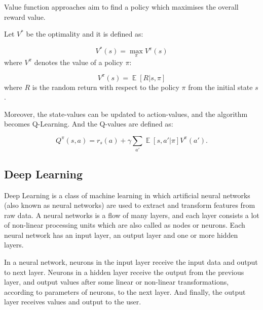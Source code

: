 \documentclass[a4paper]{article}
\DeclareMathOperator{\E}{\mathbb{E}}
\begin{document}
            Value function approaches aim to find a policy which maximises the overall reward value. 
            
            Let $V^*$ be the optimality and it is defined as:
            
            \begin{equation*}
                V^*(s) = \max_\pi V^\pi (s)
            \end{equation*}
            where $V^\pi$ denotes the value of a policy $\pi$:
            
            \begin{equation*}
                V^\pi(s) = \E[R|s,\pi]
            \end{equation*}
            where $R$ is the random return with respect to the policy $\pi$ from the initial state $s$.
            
            Moreover, the state-values can be updated to action-values, and the algorithm becomes Q-Learning.\cite{Watkins:1989} And the Q-values are defined as:\cite{Q-l}
            
            \begin{equation*}
                Q^\pi(s,a) = r_s(a) + \gamma \sum_{a'}\E[s,a'|\pi]V^\pi(a').
            \end{equation*}
        
        
        
        \subsection{Deep Learning}
        
            Deep Learning is a class of machine learning in which artificial neural networks (also known as neural networks) are used to extract and transform features from raw data. A neural networks is a flow of many layers, and each layer consists a lot of non-linear processing units which are also called as nodes or neurons. Each neural network has an input layer, an output layer and one or more hidden layers. \cite{deep-learning-methods-and-applications,Deep-Learning, Schm14}
            
            In a neural network, neurons in the input layer receive the input data and output to next layer. Neurons in a hidden layer receive the output from the previous layer, and output values after some linear or non-linear transformations, according to parameters of neurons, to the next layer. And finally, the output layer receives values and output to the user. \cite{Deep-Learning,Schmidhuber_2015,Schm14,deep-learning-methods-and-applications,Bengio_2009}
            
\end{document}
